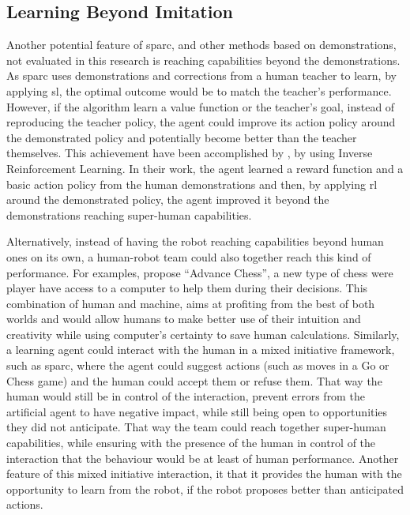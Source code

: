 
\subsection{Learning Beyond Imitation}
Another potential feature of \gls{sparc}, and other methods based on demonstrations, not evaluated in this research is reaching capabilities beyond the demonstrations. As \gls{sparc} uses demonstrations and corrections from a human teacher to learn, by applying \gls{sl}, the optimal outcome would be to match the teacher's performance. However, if the algorithm learn a value function or the teacher's goal, instead of reproducing the teacher policy, the agent could improve its action policy around the demonstrated policy and potentially become better than the teacher themselves. This achievement have been accomplished by \cite{abbeel2004apprenticeship}, by using Inverse Reinforcement Learning. In their work, the agent learned a reward function and a basic action policy from the human demonstrations and then, by applying \gls{rl} around the demonstrated policy, the agent improved it beyond the demonstrations reaching super-human capabilities. 

Alternatively, instead of having the robot reaching capabilities beyond human ones on its own, a human-robot team could also together reach this kind of performance. For examples, \cite{kasparov2010chess} propose ``Advance Chess'', a new type of chess were player have access to a computer to help them during their decisions. This combination of human and machine, aims at profiting from the best of both worlds and would allow humans to make better use of their intuition and creativity while using computer's certainty to save human calculations. Similarly, a learning agent could interact with the human in a mixed initiative framework, such as \gls{sparc}, where the agent could suggest actions (such as moves in a Go or Chess game) and the human could accept them or refuse them. That way the human would still be in control of the interaction, prevent errors from the artificial agent to have negative impact, while still being open to opportunities they did not anticipate. That way the team could reach together super-human capabilities, while ensuring with the presence of the human in control of the interaction that the behaviour would be at least of human performance. Another feature of this mixed initiative interaction, it that it provides the human with the opportunity to learn from the robot, if the robot proposes better than anticipated actions.

